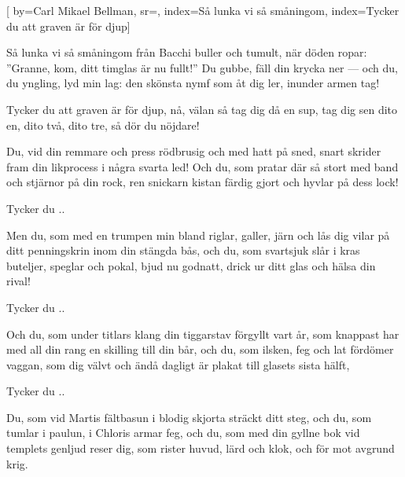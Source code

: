 

[ 		%
	by={Carl Mikael Bellman},					%
	sr={},					%
	index={Så lunka vi så småningom}, %
	index={Tycker du att graven är för djup}]						%
	
\beginverse*						%
Så lunka vi så småningom
från Bacchi buller och tumult,
när döden ropar: ''Granne, kom,
ditt timglas är nu fullt!''
Du gubbe, fäll din krycka ner —
och du, du yngling, lyd min lag:
den skönsta nymf som åt dig ler,
inunder armen tag!
\endverse							%

\beginchorus						%
Tycker du att graven är för djup,
nå, välan så tag dig då en sup,
tag dig sen dito en, dito två, dito tre,
så dör du nöjdare!
\endchorus							%

\beginverse*
Du, vid din remmare och press
rödbrusig och med hatt på sned,
snart skrider fram din likprocess
i några svarta led!
Och du, som pratar där så stort
med band och stjärnor på din rock,
ren snickarn kistan färdig gjort
och hyvlar på dess lock!
\endverse

\beginchorus						%
Tycker du ..
\endchorus							%

\beginverse*
Men du, som med en trumpen min
bland riglar, galler, järn och lås
dig vilar på ditt penningskrin
inom din stängda bås,
och du, som svartsjuk slår i kras
buteljer, speglar och pokal,
bjud nu godnatt, drick ur ditt glas
och hälsa din rival!
\endverse

\beginchorus						%
Tycker du ..
\endchorus

\beginverse*
Och du, som under titlars klang
din tiggarstav förgyllt vart år,
som knappast har med all din rang
en skilling till din bår,
och du, som ilsken, feg och lat
fördömer vaggan, som dig välvt
och ändå dagligt är plakat
till glasets sista hälft,
\endverse

\beginchorus						%
Tycker du ..
\endchorus

\beginverse*
Du, som vid Martis fältbasun
i blodig skjorta sträckt ditt steg,
och du, som tumlar i paulun,
i Chloris armar feg,
och du, som med din gyllne bok
vid templets genljud reser dig,
som rister huvud, lärd och klok,
och för mot avgrund krig.
\endverse

